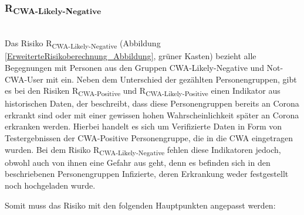 \documentclass[conference,compsoc]{IEEEtran}
\begin{document}
\subsubsection{R\textsubscript{CWA-Likely-Negative}}\label{CWALikelyNegative}
\text{}\\
Das Risiko R\textsubscript{CWA-Likely-Negative} (Abbildung \ref{ErweiterteRisikoberechnung_Abbildung}, grüner Kasten) 
bezieht alle Begegnungen mit Personen aus den Gruppen CWA-Likely-Negative und Not-CWA-User mit ein.
Neben dem Unterschied der gezählten Personengruppen, gibt es bei den  Risiken R\textsubscript{CWA-Positive} und 
R\textsubscript{CWA-Likely-Positive} einen Indikator aus historischen Daten, 
der beschreibt, dass diese Personengruppen bereits an Corona erkrankt sind oder mit einer gewissen hohen Wahrscheinlichkeit später an Corona erkranken werden. 
Hierbei handelt es sich um Verifizierte Daten in Form von Testergebnissen der CWA-Positive Personengruppe, die in die CWA eingetragen wurden.
Bei dem Risiko R\textsubscript{CWA-Likely-Negative} fehlen diese Indikatoren jedoch, obwohl auch von ihnen eine Gefahr aus geht,
denn es befinden sich in den beschriebenen Personengruppen Infizierte, deren Erkrankung weder festgestellt noch hochgeladen wurde.

Somit muss das Risiko mit den folgenden Hauptpunkten angepasst werden:
\end{document}
